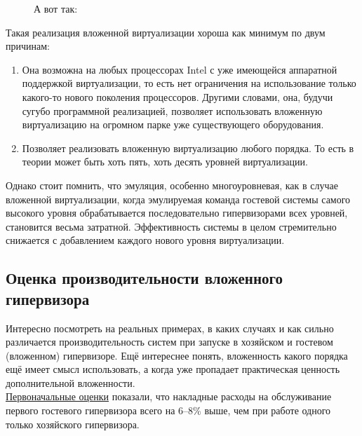 \documentclass[14pt, a4paper]{article}
\begin{document}
\begin{figure}[h]
    А вот так:\\

    \label{framework} 
\end{figure}

Такая реализация вложенной виртуализации хороша как минимум по двум причинам:
\begin{enumerate}
    \item Она возможна на любых процессорах Intel с уже имеющейся аппаратной поддержкой
    виртуализации, то есть нет ограничения на использование только какого-то нового поколения
    процессоров. Другими словами, она, будучи сугубо программной реализацией, позволяет
    использовать вложенную виртуализацию на огромном парке уже существующего
    оборудования.
    \item Позволяет реализовать вложенную виртуализацию любого порядка. То есть в теории может
    быть хоть пять, хоть десять уровней виртуализации.
\end{enumerate}

Однако стоит помнить, что эмуляция, особенно многоуровневая, как в случае вложенной
виртуализации, когда эмулируемая команда гостевой системы самого высокого уровня
обрабатывается последовательно гипервизорами всех уровней, становится весьма затратной.
Эффективность системы в целом стремительно снижается с добавлением каждого нового уровня
виртуализации.

\subsection*{Оценка производительности вложенного гипервизора}

Интересно посмотреть на реальных примерах, в каких случаях и как сильно различается
производительность систем при запуске в хозяйском и гостевом (вложенном) гипервизоре. Ещё
интереснее понять, вложенность какого порядка ещё имеет смысл использовать, а когда уже
пропадает практическая ценность дополнительной вложенности.\\

\href{https://www.usenix.org/}{Первоначальные оценки} показали, что накладные расходы на обслуживание первого гостевого
гипервизора всего на 6–8\% выше, чем при работе одного только хозяйского гипервизора.\\
\end{document}
